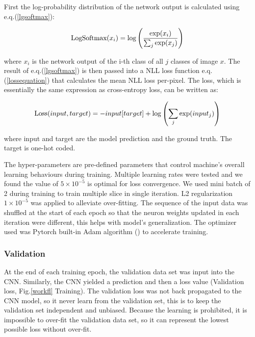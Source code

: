 \documentclass[draft,linenumbers]{agujournal2018}
\begin{document}
First the log-probability distribution of the network output is calculated using e.q.(\ref{lgsoftmax}):
\begin{linenomath*}
\begin{equation}\label{lgsoftmax}
    \centering
    \text{LogSoftmax}(x_{i}) = \log\left(\frac{\exp(x_i) }{ \sum_j \exp(x_j)} \right)
\end{equation}
\end{linenomath*}
where $x_i$ is the network output of the i-th class of all $j$ classes of image $x$. The result of e.q.(\ref{lgsoftmax}) is then passed into a NLL loss function e.q.(\ref{lossequation}) that calculates the mean NLL loss per-pixel. The loss, which is essentially the same expression as cross-entropy loss, can be written as:
\begin{linenomath*}
\begin{equation}\label{lossequation}
    \centering
    \text{Loss}(input, target) 
    = -input[target] + \log\left(\sum_j\exp(input_j)\right)
\end{equation}
\end{linenomath*}
where input and target are the model prediction and the ground truth. The target is one-hot coded.

The hyper-parameters are pre-defined parameters that control machine's overall learning behaviours during training. Multiple learning rates were tested and we found the value of $5\times10^{-5}$ is optimal for loss convergence. We used mini batch of 2 during training to train multiple slice in single iteration. L2 regularization $1\times10^{-5}$ was applied to alleviate over-fitting. The sequence of the input data was shuffled at the start of each epoch so that the neuron weights updated in each iteration were different, this helps with model's generalization. The optimizer used was Pytorch built-in Adam algorithm (\citet{kingma2014adam}) to accelerate training. 

\subsubsection{Validation}
At the end of each training epoch, the validation data set was input into the CNN. Similarly, the CNN yielded a prediction and then a loss value (Validation loss, Fig.\ref{workfl} Training). The validation loss was not back propagated to the CNN model, so it never learn from the validation set, this is to keep the validation set independent and unbiased. Because the learning is prohibited, it is impossible to over-fit the validation data set, so it can represent the lowest possible loss without over-fit.
\end{document}
